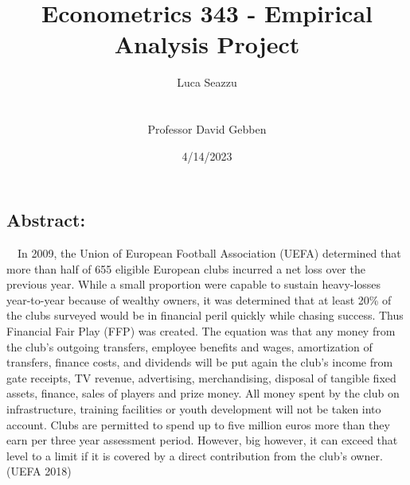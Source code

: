 \documentclass[
  12pt,
]{article}
\title{Econometrics 343 - Empirical Analysis Project}
\author{Luca Seazzu\\
\strut \\
Professor David Gebben}
\date{4/14/2023}
\begin{document}
\maketitle

\newcommand{\Prob}{\operatorname{Pr}}
\newcommand{\Binom}{\operatorname{Binom}}
\newcommand{\Unif}{\operatorname{Unif}}
\newcommand{\Triangle}{\operatorname{Triangle}}
\newcommand{\Norm}{\operatorname{Norm}}
\newcommand{\Beta}{\operatorname{Beta}}
\newcommand{\E}{\operatorname{E}}
\newcommand{\Var}{\operatorname{Var}}
\newcommand{\SD}{\operatorname{SD}}

\newpage

\subsection{Abstract:}\label{abstract}

~~In 2009, the Union of European Football Association (UEFA) determined
that more than half of 655 eligible European clubs incurred a net loss
over the previous year. While a small proportion were capable to sustain
heavy-losses year-to-year because of wealthy owners, it was determined
that at least 20\% of the clubs surveyed would be in financial peril
quickly while chasing success. Thus Financial Fair Play (FFP) was
created. The equation was that any money from the club's outgoing
transfers, employee benefits and wages, amortization of transfers,
finance costs, and dividends will be put again the club's income from
gate receipts, TV revenue, advertising, merchandising, disposal of
tangible fixed assets, finance, sales of players and prize money. All
money spent by the club on infrastructure, training facilities or youth
development will not be taken into account. Clubs are permitted to spend
up to five million euros more than they earn per three year assessment
period. However, big however, it can exceed that level to a limit if it
is covered by a direct contribution from the club's owner. (UEFA 2018)
\end{document}

